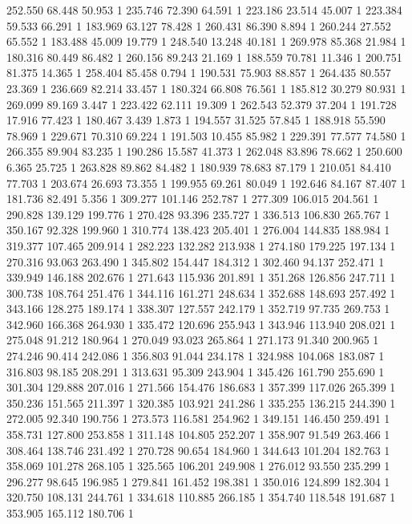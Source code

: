 	252.550	68.448	50.953	1
	235.746	72.390	64.591	1
	223.186	23.514	45.007	1
	223.384	59.533	66.291	1
	183.969	63.127	78.428	1
	260.431	86.390	8.894	1
	260.244	27.552	65.552	1
	183.488	45.009	19.779	1
	248.540	13.248	40.181	1
	269.978	85.368	21.984	1
	180.316	80.449	86.482	1
	260.156	89.243	21.169	1
	188.559	70.781	11.346	1
	200.751	81.375	14.365	1
	258.404	85.458	0.794	1
	190.531	75.903	88.857	1
	264.435	80.557	23.369	1
	236.669	82.214	33.457	1
	180.324	66.808	76.561	1
	185.812	30.279	80.931	1
	269.099	89.169	3.447	1
	223.422	62.111	19.309	1
	262.543	52.379	37.204	1
	191.728	17.916	77.423	1
	180.467	3.439	1.873	1
	194.557	31.525	57.845	1
	188.918	55.590	78.969	1
	229.671	70.310	69.224	1
	191.503	10.455	85.982	1
	229.391	77.577	74.580	1
	266.355	89.904	83.235	1
	190.286	15.587	41.373	1
	262.048	83.896	78.662	1
	250.600	6.365	25.725	1
	263.828	89.862	84.482	1
	180.939	78.683	87.179	1
	210.051	84.410	77.703	1
	203.674	26.693	73.355	1
	199.955	69.261	80.049	1
	192.646	84.167	87.407	1
	181.736	82.491	5.356	1
	309.277	101.146	252.787	1
	277.309	106.015	204.561	1
	290.828	139.129	199.776	1
	270.428	93.396	235.727	1
	336.513	106.830	265.767	1
	350.167	92.328	199.960	1
	310.774	138.423	205.401	1
	276.004	144.835	188.984	1
	319.377	107.465	209.914	1
	282.223	132.282	213.938	1
	274.180	179.225	197.134	1
	270.316	93.063	263.490	1
	345.802	154.447	184.312	1
	302.460	94.137	252.471	1
	339.949	146.188	202.676	1
	271.643	115.936	201.891	1
	351.268	126.856	247.711	1
	300.738	108.764	251.476	1
	344.116	161.271	248.634	1
	352.688	148.693	257.492	1
	343.166	128.275	189.174	1
	338.307	127.557	242.179	1
	352.719	97.735	269.753	1
	342.960	166.368	264.930	1
	335.472	120.696	255.943	1
	343.946	113.940	208.021	1
	275.048	91.212	180.964	1
	270.049	93.023	265.864	1
	271.173	91.340	200.965	1
	274.246	90.414	242.086	1
	356.803	91.044	234.178	1
	324.988	104.068	183.087	1
	316.803	98.185	208.291	1
	313.631	95.309	243.904	1
	345.426	161.790	255.690	1
	301.304	129.888	207.016	1
	271.566	154.476	186.683	1
	357.399	117.026	265.399	1
	350.236	151.565	211.397	1
	320.385	103.921	241.286	1
	335.255	136.215	244.390	1
	272.005	92.340	190.756	1
	273.573	116.581	254.962	1
	349.151	146.450	259.491	1
	358.731	127.800	253.858	1
	311.148	104.805	252.207	1
	358.907	91.549	263.466	1
	308.464	138.746	231.492	1
	270.728	90.654	184.960	1
	344.643	101.204	182.763	1
	358.069	101.278	268.105	1
	325.565	106.201	249.908	1
	276.012	93.550	235.299	1
	296.277	98.645	196.985	1
	279.841	161.452	198.381	1
	350.016	124.899	182.304	1
	320.750	108.131	244.761	1
	334.618	110.885	266.185	1
	354.740	118.548	191.687	1
	353.905	165.112	180.706	1
